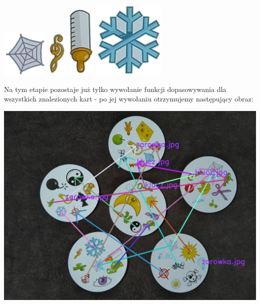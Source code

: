 \documentclass[10pt,a4paper]{article}
\begin{document}
\begin{center}
\includegraphics[scale=0.5]{2.1/card1sign4.jpg}
\includegraphics[scale=0.5]{2.1/card1sign5.jpg}
\includegraphics[scale=0.5]{2.1/card1sign6.jpg}
\includegraphics[scale=0.5]{2.1/card1sign7.jpg}
\end{center}
Na tym etapie pozostaje już tylko wywołanie funkcji dopasowywania dla wszystkich znalezionych kart - po jej wywołaniu otrzymujemy następujący obraz:
\begin{center}
\includegraphics[scale=0.25]{2.1/img_arrows0.jpg}
\end{center}
\end{document}
